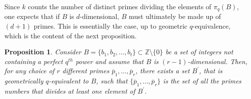 \documentclass[12pt]{amsart}
\newtheorem{proposition}[theorem]{Proposition}
\newtheorem{example}[theorem]{Example}
\newcommand{\F}{{\mathbb F}}
\newcommand{\Z}{{\mathbb Z}}
\newcommand{\GL}{\hbox{{\rm GL}}}
\newcommand{\PG}{\mathrm{PG}}
\begin{document}

Since $k$ counts the number of distinct primes dividing the elements of $\pi_{q}(B)$, one expects that if $B$ is $d$-dimensional, $B$ must ultimately be made up of $(d+1)$ primes. This is essentially the case, up to geometric $q$-equivalence, which is the content of the next proposition. 

\begin{proposition} \label{prop:reduceprimelength}
  Consider $B=\{b_1,b_2,\ldots,b_t\} \subset \Z \setminus \{0\}$ be a set of integers not containing a perfect $q^{th}$ power and assume that $B$ is $(r-1)$-dimensional. Then, for any choice of $r$ different primes $\overline{p}_1,\ldots,\overline{p}_r$, there exists a set $B^{\prime}$, that is geometrically $q$-equivalent to $B$, such that $\{\overline{p}_1,\ldots,\overline{p}_{r}\}$ is the set of all the primes numbers that divides at least one element of $B^{\prime}$.
\end{proposition}
\end{document}
